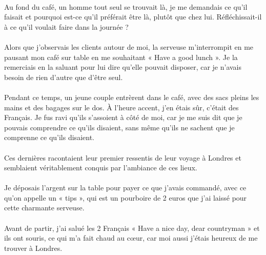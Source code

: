 \paragraph{}
Au fond du café, un homme tout seul se trouvait là, je me demandais ce qu’il
faisait et pourquoi est-ce qu’il préférait être là, plutôt que chez lui.
Réfléchissait-il à ce qu’il voulait faire dans la journée ?

\paragraph{}
Alors que j’observais les clients autour de moi, la serveuse m’interrompit en
me pausant mon café sur table en me souhaitant « Have a good lunch ».  Je la
remerciais en la saluant pour lui dire qu’elle pouvait disposer, car je n’avais
besoin de rien d’autre que d’être seul.

\paragraph{}
Pendant ce temps, un jeune couple entrèrent dans le café, avec des sacs pleins
les mains et des bagages sur le dos. À l’heure accent, j’en étais sûr, c’était
des Français. Je fus ravi qu’ils s’assoient à côté de moi, car je me suis dit
que je pouvais comprendre ce qu’ils disaient, sans même qu’ils ne sachent que
je comprenne ce qu’ils disaient.

\paragraph{}
Ces dernières racontaient leur premier ressentis de leur voyage à Londres et
semblaient véritablement conquis par l’ambiance de ces lieux.

\paragraph{}
Je déposais l’argent sur la table pour payer ce que j’avais commandé, avec ce
qu’on appelle un « tips », qui est un pourboire de 2 euros que j’ai laissé pour
cette charmante serveuse.

\paragraph{}
Avant de partir, j’ai salué les 2 Français « Have a nice day, dear countryman »
et ils ont souris, ce qui m’a fait chaud au cœur, car moi aussi j’étais heureux
de me trouver à Londres.

